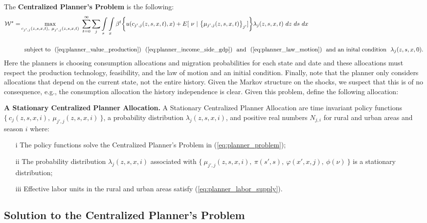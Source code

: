 \documentclass[12pt,pdftex]{article}
\begin{document}
\begin{onehalfspacing}
The \textbf{Centralized Planner's Problem} is the following:
{\small
\begin{align}
\mathcal{W}^{*} = & \max\limits_{c_{j',j}(z, s, x, t),\ \mu_{j',j}(z, s, x, t)} \ \sum_{t=0}^{\infty}\sum_{j} \int\limits_{s} \int\limits_{x} \beta^{t} \bigg \{ u(c_{j',j}(z, s, x, t), x) + E[ \ \nu \ | \ \big\{\mu_{j',j}(z,s,x,t)\big\}_{j'}]  \bigg \} \lambda_{j}(z, s, x, t) \ dz \ ds \ dx \ \ \nonumber \\
\nonumber \\
& \ \ \mbox{subject to} \ \ (\ref{eq:planner_value_production}) \ \ (\ref{eq:planner_income_side_gdp}) \ \ \mbox{and} \ \ (\ref{eq:planner_law_motion}) \ \ \mbox{and an inital condition} \ \ \lambda_j(z, s, x,0).
\label{eq:planner_problem}
\end{align}}Here the planners is choosing consumption allocations and migration probabilities for each state and date and these allocations must respect the production technology, feasibility, and the law of motion and an initial condition. Finally, note that the planner only considers allocations that depend on the current state, not the entire history. Given the Markov structure on the shocks, we suspect that this is of no consequence, e.g., the consumption allocation the history independence is clear. Given this problem, define the following allocation:

\textbf{A Stationary Centralized Planner Allocation.}  A Stationary Centralized Planner Allocation are time invariant policy functions $\{\ c_{j}(z, s, x, i),\ \mu_{j',j}(z, s, x, i) \ \}$, a probability distribution $\lambda_{j}(z, s, x, i)$, and positive real numbers $N_{j,i}$ for rural and urban areas and season $i$ where:
\begin{itemize}
\item[i] The policy functions solve the Centralized Planner's Problem in (\ref{eq:planner_problem});
\item[ii] The probability distribution $\lambda_{j}(z, s, x, i)$ associated with $\{\ \mu_{j',j}(z, s, x, i), \ \pi(s',s), \ \varphi(x',x, j), \ \phi(\nu) \ \}$ is a stationary distribution;
\item[iii] Effective labor units in the rural and urban areas satisfy (\ref{eq:planner_labor_supply}).
\end{itemize}

\subsection{Solution to the Centralized Planner's Problem}


\end{onehalfspacing}
\end{document}
